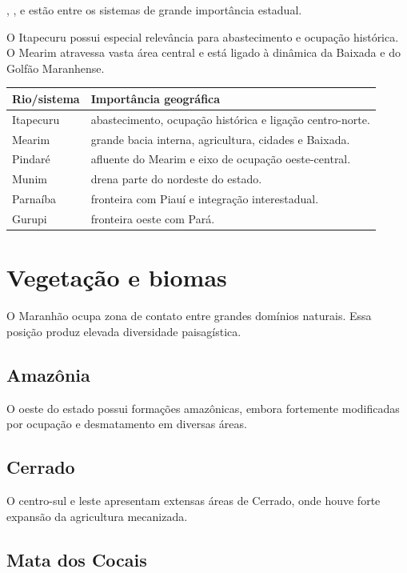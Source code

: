 , ,  e  estão entre os sistemas de grande importância estadual.

O Itapecuru possui especial relevância para abastecimento e ocupação histórica. O Mearim atravessa vasta área central e está ligado à dinâmica da Baixada e do Golfão Maranhense.

\begin{table}[ht]
\centering
\small
\begin{tabularx}{\textwidth}{l X}
\toprule
Rio/sistema & Importância geográfica \\
\midrule
Itapecuru & abastecimento, ocupação histórica e ligação centro-norte. \\
Mearim & grande bacia interna, agricultura, cidades e Baixada. \\
Pindaré & afluente do Mearim e eixo de ocupação oeste-central. \\
Munim & drena parte do nordeste do estado. \\
Parnaíba & fronteira com Piauí e integração interestadual. \\
Gurupi & fronteira oeste com Pará. \\
\bottomrule
\end{tabularx}
\end{table}

\section{Vegetação e biomas}

O Maranhão ocupa zona de contato entre grandes domínios naturais. Essa posição produz elevada diversidade paisagística.

\subsection{Amazônia}

O oeste do estado possui formações amazônicas, embora fortemente modificadas por ocupação e desmatamento em diversas áreas.

\subsection{Cerrado}

O centro-sul e leste apresentam extensas áreas de Cerrado, onde houve forte expansão da agricultura mecanizada.

\subsection{Mata dos Cocais}

